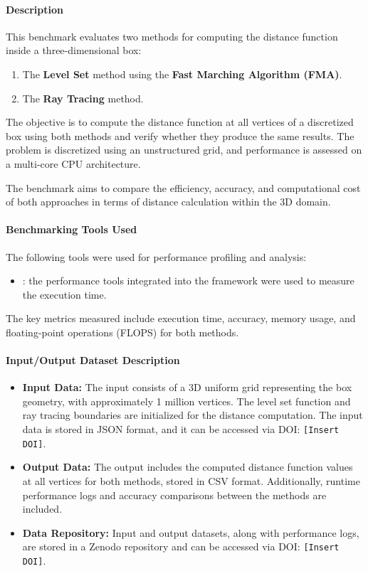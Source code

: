 \paragraph{Description}
This benchmark evaluates two methods for computing the distance function inside a three-dimensional box:
\begin{enumerate}
    \item The \textbf{Level Set} method using the \textbf{Fast Marching Algorithm (FMA)}.
    \item The \textbf{Ray Tracing} method.
\end{enumerate}
The objective is to compute the distance function at all vertices of a discretized box using both methods and verify whether they produce the same results.
The problem is discretized using an unstructured grid, and performance is assessed on a multi-core CPU architecture.

The benchmark aims to compare the efficiency, accuracy, and computational cost of both approaches in terms of distance calculation within the 3D domain.

\paragraph{Benchmarking Tools Used}
The following tools were used for performance profiling and analysis:
\begin{itemize}
\item \textbf{\Feelpp}: the performance tools integrated into the \Feelpp framework were used to measure the execution time.
\end{itemize}

The key metrics measured include execution time, accuracy, memory usage, and floating-point operations (FLOPS) for both methods.

\paragraph{Input/Output Dataset Description}
\begin{itemize}
    \item \textbf{Input Data:} The input consists of a 3D uniform grid representing the box geometry, with approximately 1 million vertices. The level set function and ray tracing boundaries are initialized for the distance computation. The input data is stored in JSON format, and it can be accessed via DOI: \texttt{[Insert DOI]}.

    \item \textbf{Output Data:} The output includes the computed distance function values at all vertices for both methods, stored in CSV format. Additionally, runtime performance logs and accuracy comparisons between the methods are included.

    \item \textbf{Data Repository:} Input and output datasets, along with performance logs, are stored in a Zenodo repository and can be accessed via DOI: \texttt{[Insert DOI]}.
\end{itemize}

